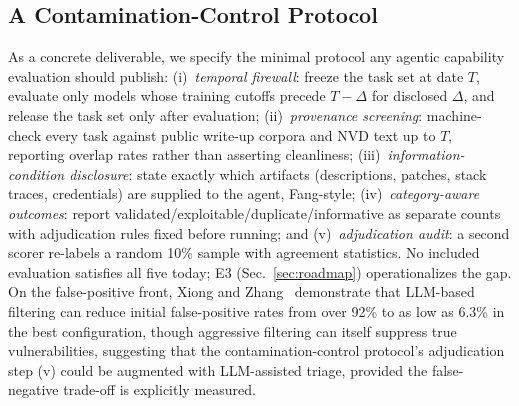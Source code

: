 \documentclass[conference,compsoc]{IEEEtran}
\begin{document}
\subsection{A Contamination-Control Protocol}
As a concrete deliverable, we specify the minimal protocol any agentic capability evaluation
should publish: (i)~\emph{temporal firewall}: freeze the task set at date $T$, evaluate only
models whose training cutoffs precede $T-\Delta$ for disclosed $\Delta$, and release the task
set only after evaluation; (ii)~\emph{provenance screening}: machine-check every task against
public write-up corpora and NVD text up to $T$, reporting overlap rates rather than asserting
cleanliness; (iii)~\emph{information-condition disclosure}: state exactly which artifacts
(descriptions, patches, stack traces, credentials) are supplied to the agent, Fang-style;
(iv)~\emph{category-aware outcomes}: report validated/exploitable/duplicate/informative as
separate counts with adjudication rules fixed before running; and (v)~\emph{adjudication
audit}: a second scorer re-labels a random 10\% sample with agreement statistics. No
included evaluation satisfies all five today; E3 (Sec.~\ref{sec:roadmap}) operationalizes the
gap. On the false-positive front, Xiong and Zhang~\cite{siftingnoise2026} demonstrate that
LLM-based filtering can reduce initial false-positive rates from over 92\% to as low as 6.3\%
in the best configuration, though aggressive filtering can itself suppress true
vulnerabilities, suggesting that the contamination-control protocol's adjudication step (v)
could be augmented with LLM-assisted triage, provided the false-negative trade-off is explicitly
measured.
\end{document}
